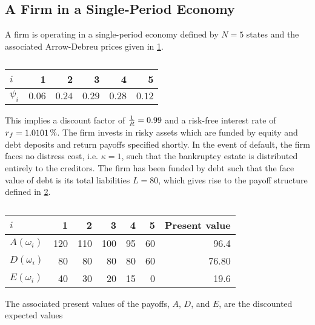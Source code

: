 \documentclass[main.tex]{subfiles}
\begin{document}
    \subsection{A Firm in a Single-Period Economy}

    A firm is operating in a single-period economy
    defined by $N=5$ states and the associated Arrow-Debreu prices given in \cref{tbl:example-firm-structure}.
        \begin{table}[H]
            \centering
            \begin{tabular}{l|rrrrr}
                $i$ & 1 & 2 & 3 & 4 & 5 \\
                \hline
                $\psi_{i}$ & $\num{0.06}$ & $\num{0.24}$ & $\num{0.29}$ & $\num{0.28}$ & $\num{0.12}$ \\
            \end{tabular}
            \caption{}
            \label{tbl:example-firm-structure}
        \end{table}
    This implies a discount factor of $\frac{1}{R} = \num{0.99}$ and a risk-free interest rate of $\rfrate = \pct{0.010101}$.
    The firm invests in risky assets 
    which are funded by equity and debt deposits and return payoffs specified shortly.
    In the event of default, the firm faces no distress cost, i.e. $\kappa = 1$, 
    such that the bankruptcy estate is distributed entirely to the creditors.
    The firm has been funded by debt such that the face value of debt is its total liabilities $L=\num{80}$, 
    which gives rise to the payoff structure defined in \cref{tbl:example-pre-project-capital-structure}.
    \begin{table}[H]
        \centering
        \begin{tabular}{l|rrrrr||r}
            $i$ & 1 & 2 & 3 & 4 & 5 & Present value \\
            \hline
            \rule{0pt}{1.1em}
            $A(\omega_{i})$ & \num{120} & \num{110} & \num{100} & \num{95} & \num{60} & \num{96.4} \\
            $D(\omega_{i})$ & \num{80} & \num{80} & \num{80} & \num{80} & \num{60} & \num{76.80}\\
            $E(\omega_{i})$ & \num{40} & \num{30} & \num{20} & \num{15} & \num{0} & \num{19.6}
        \end{tabular}
        \caption{}
        \label{tbl:example-pre-project-capital-structure}
    \end{table}
    The associated present values of the payoffs, $A$, $D$, and $E$, 
    are the discounted expected values
\end{document}
